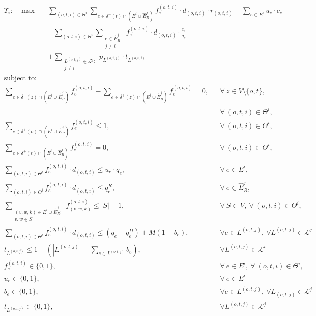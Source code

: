 \documentclass[review]{elsarticle}
\begin{document}
    \begin{align}
        &  \Upsilon_i: \hspace{10pt} \max  &&  \sum_{(o,t,i)\in \Theta^i} \sum_{e \in \delta^-(t)\cap (E^i\cup \widehat{E}_R^j)} f_e^{(o,t,i)} \cdot d_{(o,t,i)} \cdot r_{(o,t,i)} - \sum_{e\in E^i} u_{e}\cdot c_{e} \hspace{20pt} -  \nonumber  \label{eq:IterativeA}\\
        & 								  && - \sum_{(o,t,i) \in \Theta^i} \sum_{\substack{e \in \widehat{E}_R^j\colon \\ j\not = i}} f_e^{(o,t,i)} \cdot d_{(o,t,i)} \cdot \frac{c_e}{q_e}  \nonumber\\
        & 								  && + \sum_{\substack{L^{(o,t,j)} \in \mathcal{L}^j \colon \\ j\not = i}} p_{L^{(o,t,j)}} \cdot t_{L^{(o,t,j)}}
    \end{align}
    \begin{align}
        & \text{subject to:}       && \nonumber\\
& \sum_{e \in \delta^-(z)\cap (E^i\cup \widehat{E}_R^j)} f_e^{(o,t,i)}-\sum_{e \in \delta^+(z)\cap (E^i\cup \widehat{E}_R^j)} f_{e}^{(o,t,i)}  = 0,                                   && \forall\ z\in V\setminus\{o,t\},\nonumber\\[-1em]
& && \forall\ (o,t,i)\in\Theta^i,  \label{eq:IterativeB}\\[1em]
& \sum_{e \in \delta^+(o)\cap (E^i\cup \widehat{E}_R^j)} f_e^{(o,t,i)}  \leq 1, && \forall\ (o,t,i)\in \Theta^i, \label{eq:IterativeC} \\
& \sum_{e \in \delta^+(t)\cap (E^i\cup \widehat{E}_R^j)} f_e^{(o,t,i)}  = 0,  && \forall\ (o,t,i)\in \Theta^i, \label{eq:IterativeD} \\
& \sum_{(o,t,i) \in \Theta^i} f_e^{(o,t,i)}\cdot d_{(o,t,i)} \leq u_e\cdot q_e, && \forall\ e \in E^i, \label{eq:IterativeE}  \\
& \sum_{(o,t,i) \in \Theta^i} f_e^{(o,t,i)}\cdot d_{(o,t,i)} \leq  q_e^R, && \forall\ e \in \widehat{E}_R^j,\label{eq:IterativeF}  \\
& \sum_{\substack{(v,w,k) \in E^i\cup \widehat{E}_R^j\colon \\ v,w \in S}}  f_{(v,w,k)}^{(o,t,i)}  \leq |S| -1, && \forall\ S \subset V,\ \forall\ (o,t,i) \in \Theta^i, \label{eq:IterativeG}\\
&\sum_{(o,t,i)\in \Theta^i} f_e^{(o,t,i)}\cdot d_{(o,t,i)} \leq (q_e - q_e^D) +M(1-b_e),\quad && \forall e \in L^{(o,t,j)},\ \forall L^{(o,t,j)} \in \mathcal{L}^j \label{eq:IterativeH}\\
& t_{L^{(o,t,j)}} \leq 1 -  (|L^{(o,t,j)}|-\sum_{e \in L^{(o,t,j)}} b_e), && \forall L^{(o,t,j)} \in \mathcal{L}^i \label{eq:IterativeI}\\
& f_e^{(o,t,i)}  \in \{0,1\}, && \forall\ e \in E^i,\ \forall\ (o,t,i) \in \Theta^i, \label{eq:IterativeJ} \\
&  u_e   \in \{0,1\},   && \forall\ e \in E^i  \label{eq:IterativeK}\\
& b_e \in \{0,1\}, && \forall e \in L^{(o,t,j)},\ \forall L_{(o,t,j)}\in \mathcal{L}^j\label{eq:IterativeL}\\
& t_{L^{(o,t,j)}} \in \{0,1\}, && \forall L^{(o,t,j)} \in \mathcal{L}^j \label{eq:IterativeM}
    \end{align}
\end{document}
